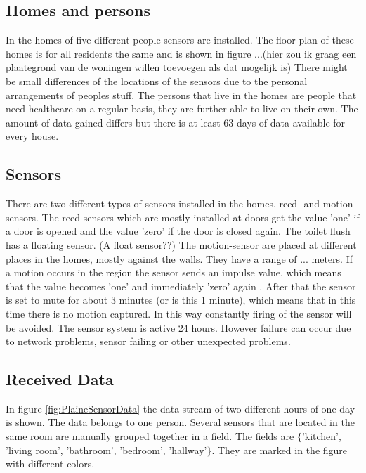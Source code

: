 \documentclass[11pt,a4paper]{article}
\begin{document}
\subsection{Homes and persons}
In the homes of five different people sensors are installed. The floor-plan of these homes is for all residents the same and is shown in figure ...(hier zou ik graag een plaategrond van de woningen willen toevoegen als dat mogelijk is) There might be small differences of the locations of the sensors due to the personal arrangements of peoples stuff.
The persons that live in the homes are people that need healthcare on a regular basis, they are further able to live on their own. The amount of data gained differs but there is at least 63 days of data available for every house. 
\subsection{Sensors}
There are two different types of sensors installed in the homes, reed- and motion-sensors. The reed-sensors which are mostly installed at doors get the value 'one' if a door is opened and the value 'zero' if the door is closed again. The toilet flush has a floating sensor. (A float sensor??)
The motion-sensor are placed at different places in the homes, mostly against the walls. They have a range of ... meters. If a motion occurs in the region the sensor sends an impulse value, which means that the value becomes 'one' and immediately 'zero' again . After that the sensor is set to mute for about 3 minutes (or is this 1 minute), which means that in this time there is no motion captured. In this way constantly firing of the sensor will be avoided. The sensor system is active 24 hours. However failure can occur due to network problems, sensor failing or other unexpected problems.

\subsection{Received Data}
In figure \ref{fig:PlaineSensorData} the data stream of two different hours of one day is shown. The data belongs to one person. Several sensors that are located in the same room are manually grouped together in a field. The fields are $\{$'kitchen', 'living room', 'bathroom', 'bedroom', 'hallway'$\}$. They are marked in the figure with different colors.
\end{document}
